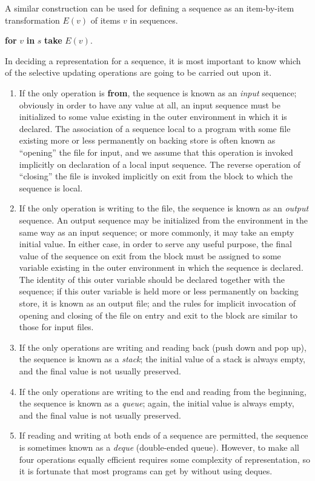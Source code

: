 A similar construction can be used for defining a sequence as an item-by-item transformation $E(v)$ of items $v$ in sequences.

\quad \textbf{for} $v$ \textbf{in} $s$ \textbf{take} $E(v)$.

In deciding a representation for a sequence, it is most important to know which of the selective updating operations are going to be carried out upon it.

\begin{enumerate}[leftmargin=2\parindent, label=(\arabic*)]
	\item If the only operation is \textbf{from}, the sequence is known as an \textit{input} sequence; obviously in order to have any value at all, an input sequence must be initialized to some value existing in the outer environment in which it is declared. The association of a sequence local to a program with some file existing more or less permanently on backing store is often known as ``opening'' the file for input, and we assume that this operation is invoked implicitly on declaration of a local input sequence. The reverse operation of ``closing'' the file is invoked implicitly on exit from the block to which the sequence is local.

	\item If the only operation is writing to the file, the sequence is known as an \textit{output} sequence. An output sequence may be initialized from the environment in the same way as an input sequence; or more commonly, it may take an empty initial value. In either case, in order to serve any useful purpose, the final value of the sequence on exit from the block must be assigned to some variable existing in the outer environment in which the sequence is declared. The identity of this outer variable should be declared together with the sequence; if this outer variable is held more or less permanently on backing store, it is known as an output file; and the rules for implicit invocation of opening and closing of the file on entry and exit to the block are similar to those for input files.

	\item If the only operations are writing and reading back (push down and 	pop up), the sequence is known as a \textit{stack}; the initial value of a stack is always empty, and the final value is not usually preserved. 

	\item If the only operations are writing to the end and reading from the beginning, the sequence is known as a \textit{queue}; again, the initial value is always empty, and the final value is not usually preserved.

	\item If reading and writing at both ends of a sequence are permitted, the sequence is sometimes known as a \textit{deque} (double-ended queue). However, to make all four operations equally efficient requires some complexity of representation, so it is fortunate that most programs can get by without using deques.
\end{enumerate}

